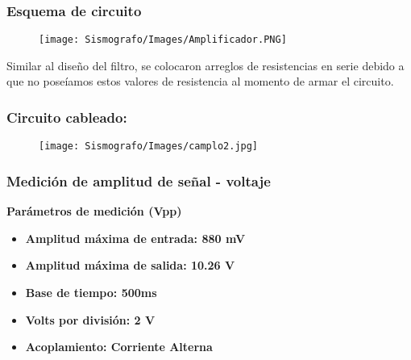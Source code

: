 \documentclass[12pt]{article}
\begin{document}
	        \subsubsection{Esquema de circuito}
	        
	        \begin{figure}[h!]
                \centering
                \texttt{[image: Sismografo/Images/Amplificador.PNG]}
            \end{figure} 
            
            Similar al diseño del filtro, se colocaron arreglos de resistencias en serie debido a que no poseíamos estos valores de resistencia al momento de armar el circuito.
            \newpage
            \subsubsection{Circuito cableado:}
            \begin{figure}[h!]
                \centering
                \texttt{[image: Sismografo/Images/camplo2.jpg]}
            \end{figure} 
            
	        \subsubsection{Medición de amplitud de señal - voltaje}
	        
	        \textbf{Parámetros de medición (Vpp)}
            \begin{multicols}{2}
                \begin{itemize}
                    \item[\checkmark] \textbf{Amplitud máxima de entrada: 880 mV}
                    \item[\checkmark] \textbf{Amplitud máxima de salida: 10.26 V}
                    \item[\checkmark] \textbf{Base de tiempo: 500ms}
            \columnbreak
                    \item[\checkmark] \textbf{Volts por división: 2 V}
                    \item[\checkmark] \textbf{Acoplamiento: Corriente Alterna}
                \end{itemize}
            \end{multicols}
            
\end{document}

